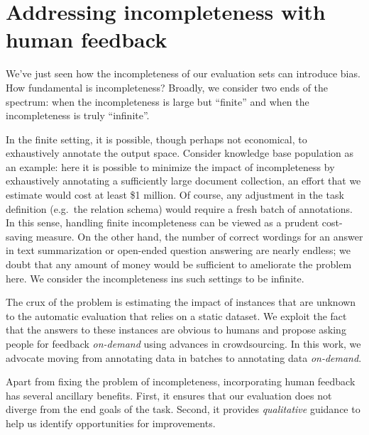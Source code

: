 \section{Addressing incompleteness with human feedback}
We've just seen how the incompleteness of our evaluation sets can introduce bias.
How fundamental is incompleteness?
Broadly, we consider two ends of the spectrum: when the incompleteness is large but ``finite'' and when the incompleteness is truly ``infinite''.

In the finite setting, it is possible, though perhaps not economical, to exhaustively annotate the output space.
Consider knowledge base population as an example: here it is possible to minimize the impact of incompleteness by exhaustively annotating a sufficiently large document collection, an effort that we estimate would cost at least \$1 million.
Of course, any adjustment in the task definition (e.g.\ the relation schema) would require a fresh batch of annotations.
In this sense, handling finite incompleteness can be viewed as a prudent cost-saving measure.
On the other hand, the number of correct wordings for an answer in text summarization or open-ended question answering are nearly endless; we doubt that any amount of money would be sufficient to ameliorate the problem here.
We consider the incompleteness ins such settings to be infinite. 

The crux of the problem is estimating the impact of instances that are unknown to the automatic evaluation that relies on a static dataset.
We exploit the fact that the answers to these instances are obvious to humans and propose asking people for feedback \textit{on-demand} using advances in crowdsourcing.
In this work, we advocate moving from annotating data in batches to annotating data \textit{on-demand}.

Apart from fixing the problem of incompleteness, incorporating human feedback has several ancillary benefits.
First, it ensures that our evaluation does not diverge from the end goals of the task.
Second, it provides \textit{qualitative} guidance to help us identify opportunities for improvements.


